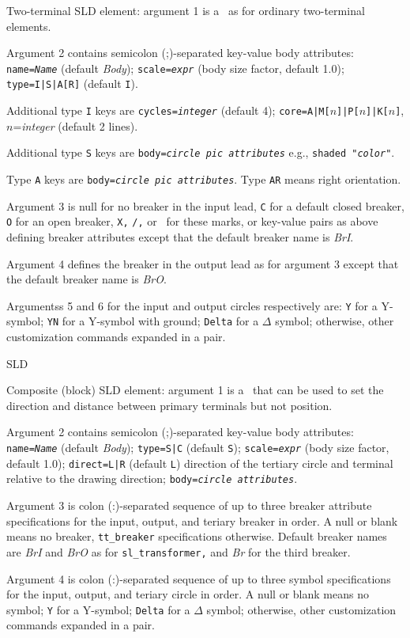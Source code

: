   {Two-terminal SLD element: argument 1 is a \linespec\ as for ordinary
   two-terminal elements.

   Argument 2 contains semicolon (;)-separated key-value body attributes:
   {\tt name={\sl{}Name}} (default {\sl Body});
   {\tt scale={\sl expr}} (body size factor, default 1.0);
   {\tt type=I|S|A[R]} (default {\tt I}).

   Additional type {\tt I} keys are
   {\tt cycles={\sl{}integer}} (default 4);
   {\tt core=A|M[$n$]|P[$n$]|K[$n$]}, $n$={\sl integer} (default 2 lines).

   Additional type {\tt S} keys are
   {\tt body={\sl circle pic attributes}} e.g., {\tt shaded "{\sl color}"}.

   Type {\tt A} keys are
   {\tt body={\sl circle pic attributes}}.  Type {\tt AR} means right
   orientation.

   Argument 3 is null for no breaker in the input lead, {\tt C} for a default
   closed breaker, {\tt O} for an open breaker, {\tt X,} {\tt /,} or \bsl\ for
   these marks, or
   key-value pairs as above defining breaker attributes
   except that the default breaker name is {\sl BrI}.

   Argument 4 defines the breaker in the output lead as for argument 3
   except that the default breaker name is {\sl BrO}.

   Argumentss 5 and 6 for the input and output circles respectively are:
   {\tt Y} for a Y-symbol;
   {\tt YN} for a Y-symbol with ground;
   {\tt Delta} for a $\Delta$ symbol;
   otherwise, other customization commands expanded in a {\tt \lbr\rbr} pair.
   }
%
  {SLD}
  {Composite (block) SLD element: argument 1 is a \linespec\ that can be used
   to set the direction and distance between primary terminals but not
   position.

   Argument 2 contains semicolon (;)-separated key-value body attributes:
   {\tt name={\sl{}Name}} (default {\sl Body});
   {\tt type=S|C} (default {\tt S});
   {\tt scale={\sl expr}} (body size factor, default 1.0);
   {\tt direct=L|R} (default {\tt L}) direction of the tertiary
     circle and terminal relative to the drawing direction;
   {\tt body={\sl circle attributes}}.

   Argument 3 is colon (:)-separated sequence of up to three breaker
   attribute specifications for the input, output, and teriary breaker
   in order.  A null or blank means no breaker, {\tt tt\_breaker}
   specifications otherwise. Default breaker names are {\sl BrI}
   and {\sl BrO} as for
   {\tt sl\_transformer,} and {\sl Br} for the third breaker. 

   Argument 4 is colon (:)-separated sequence of up to three symbol
   specifications for the input, output, and teriary circle
   in order.  A null or blank means no symbol;
   {\tt Y} for a Y-symbol;
   {\tt Delta} for a $\Delta$ symbol;
   otherwise, other customization commands expanded in a {\tt \lbr\rbr} pair.
   }
